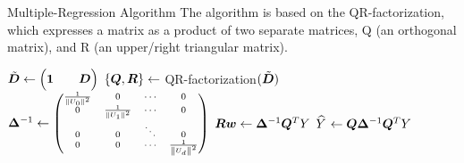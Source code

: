 %
%
\begin{frame}{Multiple-Regression Algorithm}
The algorithm is based on the QR-factorization, which expresses a matrix as a product of two separate matrices, Q (an orthogonal matrix), and R (an upper/right triangular matrix). 

\medskip

\begin{tightalgo}[H]{\textwidth-18pt}
\Algorithm{} 
$\tilde{{\boldsymbol D}} \leftarrow \Bigl(\mathbf{1} \qquad {\boldsymbol D}\Bigr)$ \;
$\{{\boldsymbol Q}, {\boldsymbol R}\} \leftarrow $ QR-factorization$(\tilde{{\boldsymbol D}})$ \;
${\bm \Delta}^{-1} \leftarrow 
\scriptsize
\begin{pmatrix} 
    \frac{1}{\left\lVert U_0\right\rVert^2} & 0 & \cdots & 0\\
    0 & \frac{1}{\left\lVert U_1\right\rVert^2} & \cdots & 0\\
        0 & 0 & \ddots & 0\\
        0 & 0 & \cdots & \frac{1}{\left\lVert U_d\right\rVert^2}\\
     \end{pmatrix}$ \;
${\boldsymbol R} {\boldsymbol w} \leftarrow {\bm \Delta}^{-1} {\boldsymbol Q}^T Y$ \;
$\mkern 1.5mu\widehat{\mkern-1.5muY}\mkern 1.5mu \leftarrow {\boldsymbol Q} {\bm \Delta}^{-1} {\boldsymbol Q}^T Y$\;
\end{tightalgo}
\end{frame}
%
